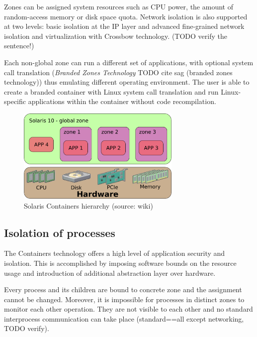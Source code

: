 \documentclass[11pt]{book}
\begin{document}
        Zones can be assigned system resources such as CPU power, the amount of random-access memory or disk space
        quota. Network isolation is also supported at two levels: basic isolation at the IP layer and advanced fine-grained
        network isolation and virtualization with Crossbow technology. (TODO verify the sentence!)

        Each non-global zone can run a different set of applications, with optional system call translation
        (\textit{Branded Zones Technology} TODO cite sag (branded zones technology)) thus emulating different operating
        environment. The user is able to create a branded container with Linux system call translation and run
        Linux-specific applications within the container without code recompilation.

        \begin{figure}[H]
          \begin{center}
            \includegraphics[width=0.7\textwidth]{img/solaris/zones.png}
          \end{center}

          \caption{Solaris Containers hierarchy (source: wiki)}
        \end{figure}


      \subsection{Isolation of processes}
      \label{sub:}

        The Containers technology offers a high level of application security and isolation. This is accomplished by
        imposing software bounds on the resource usage and introduction of additional abstraction layer over hardware.

        Every process and its children are bound to concrete zone and the assignment cannot be changed. Moreover, it is
        impossible for processes in distinct zones to monitor each other operation. They are not visible to each other
        and no standard interprocess communication can take place (standard==all except networking, TODO verify).
\end{document}
